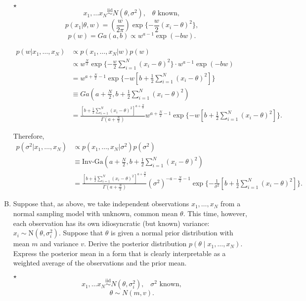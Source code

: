 \documentclass[11pt]{article}
\newcommand{\jie}{$\star$ }
\newcommand{\iid}{\overset{\text{iid}}{\sim}}
\begin{document}
\begin{enumerate}[(A)]
\bigskip

\jie 
$$x_1, \dots x_N \iid N(\theta,\sigma^2), \;\;\; \theta \text{ known},$$
$$p(x_1|\theta,w) = (\frac{w}{2\pi}) \exp \{-\frac{w}{2} (x_i-\theta)^2 \},$$
$$p(w) = Ga(a,b) \propto w^{a-1} \exp (-bw).$$

\begin{align*}
    p(w|x_1,\dots,x_N) &\propto p(x_1,\dots,x_N |w) p(w) \\
    &\propto w^{\frac{N}{2}} \exp \{-\frac{w}{2} \sum_{i=1}^N (x_i-\theta)^2 \} \cdot w^{a-1} \exp (-bw) \\
    &= w^{a+\frac{N}{2}-1} \exp \{-w[b+\frac{1}{2} \sum_{i=1}^N (x_i-\theta)^2] \} \\
    &\equiv Ga(a+\frac{N}{2}, b+ \frac{1}{2} \sum_{i=1}^N (x_i-\theta)^2 ) \\
    &= \frac{[b + \frac{1}{2} \sum_{i=1}^N (x_i-\theta)^2]^{a+\frac{N}{2}}}{\Gamma(a+\frac{N}{2})} w^{a+\frac{N}{2}-1} \exp \{-w[b+ \frac{1}{2} \sum_{i=1}^N (x_i-\theta)^2] \}.
\end{align*}

Therefore, 
\begin{align*}
    p(\sigma^2|x_1,\dots,x_N) &\propto p(x_1,\dots,x_N |\sigma^2) p(\sigma^2) \\
    &\equiv \text{Inv-Ga}(a+\frac{N}{2}, b+ \frac{1}{2} \sum_{i=1}^N (x_i-\theta)^2 ) \\
    &= \frac{[b + \frac{1}{2} \sum_{i=1}^N (x_i-\theta)^2]^{a+\frac{N}{2}}}{\Gamma(a+\frac{N}{2})} (\sigma^2)^{-a-\frac{N}{2}-1} \exp \{-\frac{1}{\sigma^2}[b+ \frac{1}{2} \sum_{i=1}^N (x_i-\theta)^2] \}.
\end{align*}

\bigskip

\item Suppose that, as above, we take independent observations $x_1, \ldots, x_N$ from a normal sampling model with unknown, common mean $\theta$.  This time, however, each observation has its own idiosyncratic (but known) variance: $x_i \sim \mbox{N}(\theta, \sigma_i^2)$.  Suppose that $\theta$ is given a normal prior distribution with mean $m$ and variance $v$.  Derive the posterior distribution $p(\theta \mid x_1, \ldots, x_N)$.  Express the posterior mean in a form that is clearly interpretable as a weighted average of the observations and the prior mean.

\bigskip

\jie
$$x_1, \dots x_N \iid N(\theta,\sigma_i^2), \;\;\; \sigma^2 \text{ known},$$
$$\theta \sim N(m,v).$$


\end{enumerate}
\end{document}

